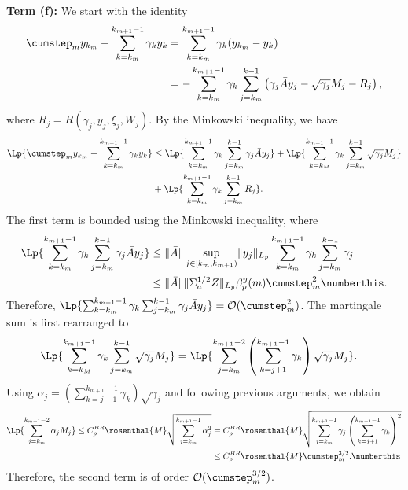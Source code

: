 \documentclass[11pt]{article}
\begin{document}
\textbf{Term (f):}
We start with the identity
\begin{align*}
    \cumstep_m y_{k_m} - \sum_{k=k_m}^{k_{m+1} - 1} \gamma_k y_k 
    &=
    \sum_{k=k_m}^{k_{m+1} - 1} \gamma_k (y_{k_m} - y_k) 
    \\ &
    = -\sum_{k=k_m}^{k_{m+1} - 1} \gamma_k \sum_{j=k_m}^{k-1} \left( \gamma_j \bar{A} y_j - \sqrt{\gamma_j} M_j - R_j
    \right)
    ,
\end{align*}
where $R_j = R(\gamma_j, y_j, \xi_j, W_j)$. 
By the Minkowski inequality, we have
\begin{align*}
    \Lp{    \cumstep_m y_{k_m} - \sum_{k=k_m}^{k_{m+1} - 1} \gamma_k y_k }
    &\leq 
    \Lp{\sum_{k=k_m}^{k_{m+1} - 1}
    \gamma_k \sum_{j=k_m}^{k - 1} \gamma_j \bar{A} y_j 
    }
    +
    \Lp{\sum_{k=k_M}^{k_{m+1} - 1} \gamma_k \sum_{j=k_m}^{k - 1} \sqrt{\gamma_j} M_j }
    \\ &
    + 
    \Lp{\sum_{k=k_m}^{k_{m+1} - 1} \gamma_k \sum_{j=k_m}^{k-1} R_j} . 
\end{align*}
The first term is bounded using the Minkowski inequality, where 
\begin{align*}
        \Lp{\sum_{k=k_m}^{k_{m+1} - 1}
    \gamma_k \sum_{j=k_m}^{k - 1} \gamma_j \bar{A} y_j 
    }
    &\leq\lVert \bar{A} \rVert \sup_{j \in [k_m, k_{m+1})} \lVert y_j \rVert_{L_p} \sum_{k=k_m}^{k_{m+1} - 1} \gamma_k \sum_{j=k_m}^{k-1} \gamma_j 
    \\ &
    \leq \lVert \bar{A} \rVert \lVert \Sigma_a^{1/2} Z \rVert_{L_p} \beta_p^y (m) \cumstep_m^2 
    \numberthis \label{eq:f1}
    . 
\end{align*}
Therefore, $\Lp{\sum_{k=k_m}^{k_{m+1} - 1}
    \gamma_k \sum_{j=k_m}^{k - 1} \gamma_j \bar{A} y_j 
    } = \mathcal{O}(\cumstep_m^2)$. 
The martingale sum is first rearranged to
\begin{align*}
    \Lp{\sum_{k=k_M}^{k_{m+1} - 1} \gamma_k \sum_{j=k_m}^{k - 1} \sqrt{\gamma_j} M_j }
    &=
    \Lp{
    \sum_{j=k_m}^{k_{m+1} - 2} \left( \sum_{k=j+1}^{k_{m+1} - 1} \gamma_k \right) \sqrt{\gamma_j} M_j
    } . 
\end{align*}
Using $\alpha_j = (\sum_{k=j+1}^{k_{m+1} - 1} \gamma_k) \sqrt{\gamma_j}$ and following previous arguments, we obtain
\begin{align*}
    \Lp{\sum_{j=k_m}^{k_{m+1} - 2}\alpha_j M_j }
    \leq 
    C_p^{BR} \rosenthal{M}\sqrt{\sum_{j=k_m}^{k_{m+1} - 1} \alpha_j^2}
    &=
    C_p^{BR} \rosenthal{M}\sqrt{\sum_{j=k_m}^{k_{m+1} - 1}
    \gamma_j \left(\sum_{k=j+1}^{k_{m+1} - 1} \gamma_k \right)^2
    }
    \\ &
    \leq C_p^{BR} \rosenthal{M}\cumstep_m^{3/2} . 
    \numberthis \label{eq:f2}
\end{align*}
Therefore, the second term is of order $\mathcal{O}(\cumstep_m^{3/2})$. 
\end{document}
